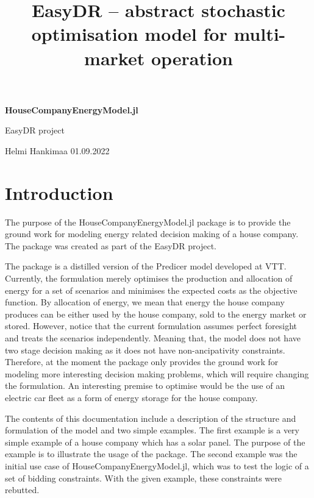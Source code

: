 \documentclass{article}
\title{EasyDR – abstract stochastic optimisation model for multi- market operation}
\begin{document}
\thispagestyle{plain}
\begin{center}
    \Large
    \textbf{HouseCompanyEnergyModel.jl}
        
    \vspace{0.4cm}
    \large
    EasyDR project
        
    \vspace{0.9cm}
    Helmi Hankimaa
    01.09.2022
       
    \vspace{0.9cm}

\end{center}
\tableofcontents

\newpage
\section{Introduction}

The purpose of the HouseCompanyEnergyModel.jl package is to provide the ground work for modeling energy related decision making of a house company. The package was created as part of the EasyDR project.

The package is a distilled version of the Predicer model developed at VTT. Currently, the formulation merely optimises the production and allocation of energy for a set of scenarios and minimises the expected costs as the objective function. By allocation of energy, we mean that energy the house company produces can be either used by the house company, sold to the energy market or stored. However, notice that the current formulation assumes perfect foresight and treats the scenarios independently. Meaning that, the model does not have two stage decision making as it does not have non-ancipativity constraints. Therefore, at the moment the package only provides the ground work for modeling more interesting decision making problems, which will require changing the formulation. An interesting premise to optimise would be the use of an electric car fleet as a form of energy storage for the house company.

The contents of this documentation include a description of the structure and formulation of the model and two simple examples. The first example is a very simple example of a house company which has a solar panel. The purpose of the example is to illustrate the usage of the package. The second example was the initial use case of HouseCompanyEnergyModel.jl, which was to test the logic of a set of bidding constraints. With the given example, these constraints were rebutted.
\end{document}
